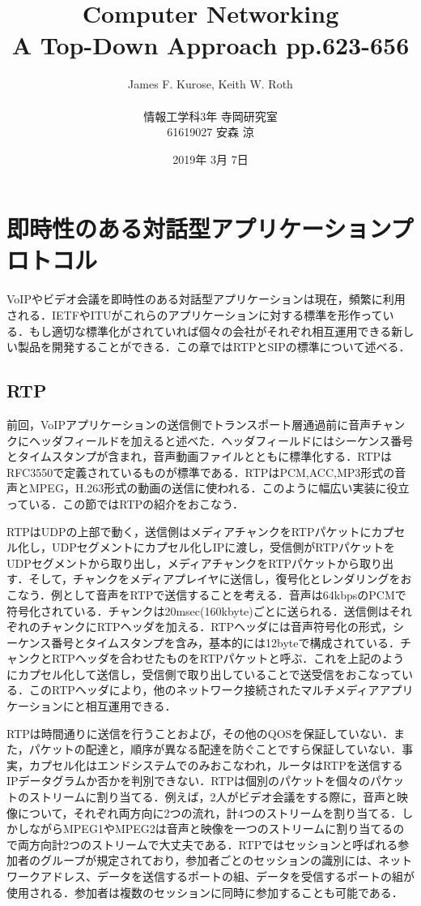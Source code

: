 \documentclass[9pt,a4j,twocolumn]{jsarticle}
\title{
    Computer Networking\\
    A Top-Down Approach pp.623-656
}
\author{
    James F. Kurose, Keith W. Roth
    \\\\
    情報工学科3年 寺岡研究室\\
    61619027 安森 涼 
}
\date{2019年 3月 7日}
\begin{document}
\maketitle

\section{即時性のある対話型アプリケーションプロトコル}
VoIPやビデオ会議を即時性のある対話型アプリケーションは現在，頻繁に利用される．IETFやITUがこれらのアプリケーションに対する標準を形作っている．もし適切な標準化がされていれば個々の会社がそれぞれ相互運用できる新しい製品を開発することができる．この章ではRTPとSIPの標準について述べる．
\subsection{RTP}
前回，VoIPアプリケーションの送信側でトランスポート層通過前に音声チャンクにヘッダフィールドを加えると述べた．ヘッダフィールドにはシーケンス番号とタイムスタンプが含まれ，音声動画ファイルとともに標準化する．RTPはRFC3550で定義されているものが標準である．RTPはPCM,ACC,MP3形式の音声とMPEG，H.263形式の動画の送信に使われる．このように幅広い実装に役立っている．この節ではRTPの紹介をおこなう．

RTPはUDPの上部で動く，送信側はメディアチャンクをRTPパケットにカプセル化し，UDPセグメントにカプセル化しIPに渡し，受信側がRTPパケットをUDPセグメントから取り出し，メディアチャンクをRTPパケットから取り出す．そして，チャンクをメディアプレイヤに送信し，復号化とレンダリングをおこなう．例として音声をRTPで送信することを考える．音声は64kbpsのPCMで符号化されている．チャンクは20msec(160kbyte)ごとに送られる．送信側はそれぞれのチャンクにRTPヘッダを加える．RTPヘッダには音声符号化の形式，シーケンス番号とタイムスタンプを含み，基本的には12byteで構成されている．チャンクとRTPヘッダを合わせたものをRTPパケットと呼ぶ．これを上記のようにカプセル化して送信し，受信側で取り出していることで送受信をおこなっている．このRTPヘッダにより，他のネットワーク接続されたマルチメディアアプリケーションにと相互運用できる．

RTPは時間通りに送信を行うことおよび，その他のQOSを保証していない．また，パケットの配達と，順序が異なる配達を防ぐことですら保証していない．事実，カプセル化はエンドシステムでのみおこなわれ，ルータはRTPを送信するIPデータグラムか否かを判別できない．RTPは個別のパケットを個々のパケットのストリームに割り当てる．例えば，2人がビデオ会議をする際に，音声と映像について，それぞれ両方向に2つの流れ，計4つのストリームを割り当てる．しかしながらMPEG1やMPEG2は音声と映像を一つのストリームに割り当てるので両方向計2つのストリームで大丈夫である．RTPではセッションと呼ばれる参加者のグループが規定されており，参加者ごとのセッションの識別には、ネットワークアドレス、データを送信するポートの組、データを受信するポートの組が使用される．参加者は複数のセッションに同時に参加することも可能である．
\end{document}
